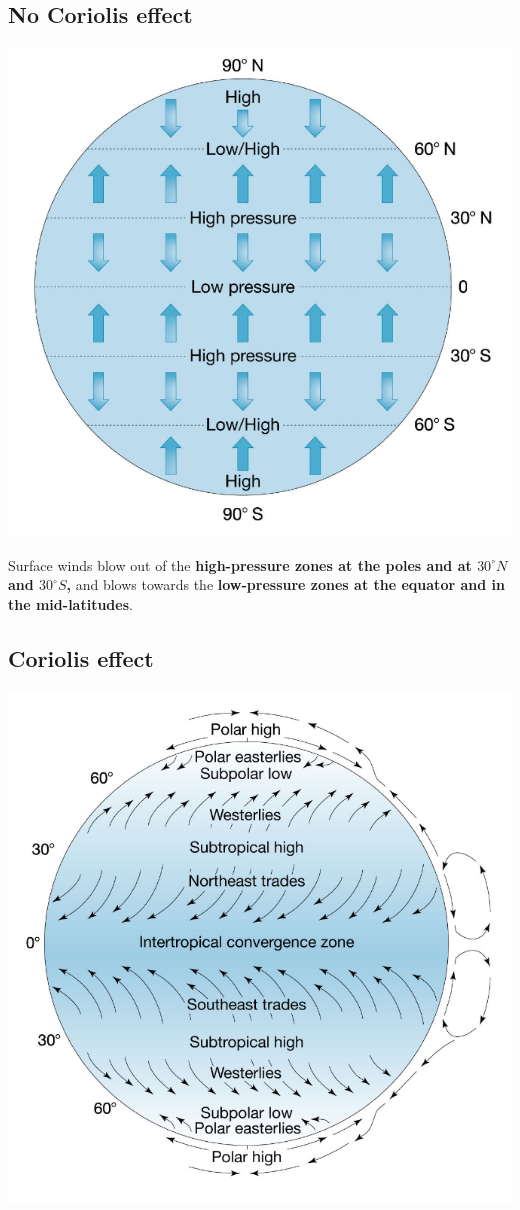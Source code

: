 \documentclass[11pt]{article}
\begin{document}
\subsection{No Coriolis effect}
\label{sec:orgd4923ef}
\begin{center}
\includegraphics[width=.9\linewidth]{./images/surface-wind-distribution.png}
\end{center}

Surface winds blow out of the \textbf{high-pressure zones at the poles and at \(30^{\circ} N\) and \(30^{\circ} S\),} and blows towards the \textbf{low-pressure zones at the equator and in the mid-latitudes}.

\subsection{Coriolis effect}
\label{sec:org9c9a415}
\begin{center}
\includegraphics[width=.9\linewidth]{./images/surface-wind-distribution-coriolis-effect.png}
\end{center}
\end{document}
